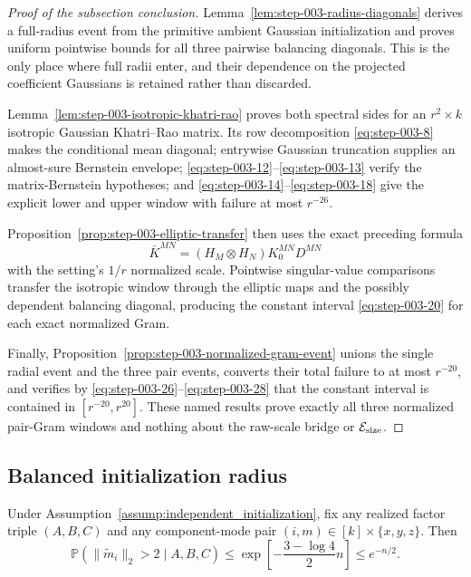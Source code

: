 \begin{proof}[Proof of the subsection conclusion]

Lemma~\ref{lem:step-003-radius-diagonals} derives a full-radius
event from the primitive ambient Gaussian initialization and proves uniform
pointwise bounds for all three pairwise balancing diagonals. This is the only
place where full radii enter, and their dependence on the projected
coefficient Gaussians is retained rather than discarded.

Lemma~\ref{lem:step-003-isotropic-khatri-rao} proves both spectral sides for
an \(r^2\times k\) isotropic Gaussian Khatri--Rao matrix. Its row
decomposition \eqref{eq:step-003-8} makes the conditional mean diagonal; entrywise Gaussian
truncation supplies an almost-sure Bernstein envelope; \eqref{eq:step-003-12}--\eqref{eq:step-003-13} verify the
matrix-Bernstein hypotheses; and \eqref{eq:step-003-14}--\eqref{eq:step-003-18} give the explicit lower and upper
window with failure at most \(r^{-26}\).

Proposition~\ref{prop:step-003-elliptic-transfer} then uses the exact
preceding formula
\[
  \bar K^{MN}=(H_M\otimes H_N)K_0^{MN}D^{MN}
\]
with the setting's \(1/r\) normalized scale. Pointwise singular-value
comparisons transfer the isotropic window through the elliptic maps and the
possibly dependent balancing diagonal, producing the constant interval \eqref{eq:step-003-20}
for each exact normalized Gram.

Finally, Proposition~\ref{prop:step-003-normalized-gram-event} unions the
single radial event and the three pair events, converts their total failure to
at most \(r^{-20}\), and verifies by \eqref{eq:step-003-26}--\eqref{eq:step-003-28} that the constant interval is
contained in \([r^{-20},r^{20}]\). These named results prove exactly all three
normalized pair-Gram windows and nothing about the raw-scale bridge or
\(\mathcal E_{\rm size}\).

\end{proof}

\subsection{Balanced initialization radius}\label{app:step-004}

\begin{lemma}
\label{lem:step-004-raw-radius-tail}
Under Assumption~\ref{assump:independent_initialization}, fix any realized
factor triple \((A,B,C)\) and any component-mode pair
\((i,m)\in[k]\times\{x,y,z\}\). Then
\[
  \mathbb P\!\left(\|\widetilde m_i\|_2>2\mid A,B,C\right)
  \le \exp\!\left[-\frac{3-\log4}{2}n\right]
  \le e^{-n/2}.
\]

\end{lemma}


